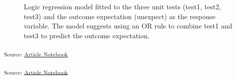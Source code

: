 \documentclass[
]{jds}
\begin{document}
\label{cell-fig-logic-reg}
\begin{figure}[H]


\caption{\label{fig-logic-reg}Logic regression model fitted to the three
unit tests (test1, test2, test3) and the outcome expectation (unexpect)
as the response variable. The model suggests using an OR rule to combine
test1 and test3 to predict the outcome expectation.}

\end{figure}%

\textsubscript{Source:
\href{https://huizezhang-sherry.github.io/paper-analysis-plan/index.qmd.html}{Article
Notebook}}

\textsubscript{Source:
\href{https://huizezhang-sherry.github.io/paper-analysis-plan/index.qmd.html}{Article
Notebook}}
\end{document}

